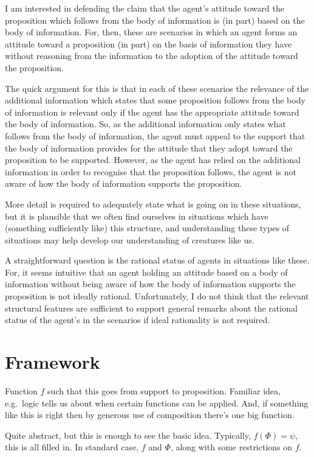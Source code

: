 \documentclass[10pt]{article}
\begin{document}
I am interested in defending the claim that the agent's attitude toward the proposition which follows from the body of information is (in part) based on the body of information.
For, then, these are scenarios in which an agent forms an attitude toward a proposition (in part) on the basis of information they have without reasoning from the information to the adoption of the attitude toward the proposition.

The quick argument for this is that in each of these scenarios the relevance of the additional information which states that some proposition follows from the body of information is relevant only if the agent has the appropriate attitude toward the body of information.
So, as the additional information only states what follows from the body of information, the agent must appeal to the support that the body of information provides for the attitude that they adopt toward the proposition to be supported.
However, as the agent has relied on the additional information in order to recognise that the proposition follows, the agent is not aware of how the body of information supports the proposition.

More detail is required to adequately state what is going on in these situations, but it is plausible that we often find ourselves in situations which have (something sufficiently like) this structure, and understanding these types of situations may help develop our understanding of creatures like us.

A straightforward question is the rational status of agents in situations like these.
For, it seems intuitive that an agent holding an attitude based on a body of information without being aware of how the body of information supports the proposition is not ideally rational.
Unfortunately, I do not think that the relevant structural features are sufficient to support general remarks about the rational status of the agent's in the scenarios if ideal rationality is not required.


\section{Framework}
\label{sec:framework}

Function \(f\) such that this goes from support to proposition.
Familiar idea, e.g.\ logic tells us about when certain functions can be applied.
And, if something like this is right then by generous use of composition there's one big function.

Quite abstract, but this is enough to see the basic idea.
Typically, \(f(\Phi) = \psi\), this is all filled in.
In standard case, \(f\) and \(\Phi\), along with some restrictions on \(f\).
\end{document}
